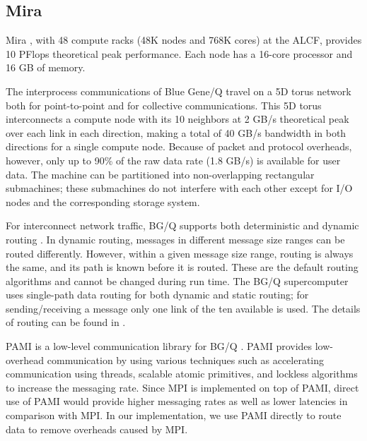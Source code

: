 \subsection{Mira}
\label{sec:system}

Mira \cite{Chen:BGQ}, with 48 compute racks (48K nodes and 768K cores) at the ALCF, provides 10 PFlops theoretical peak performance. Each node has a 16-core processor and 16 GB of memory.

The interprocess communications of Blue Gene/Q travel on a 5D torus network both for point-to-point and for collective communications. This 5D torus interconnects a compute node with its 10 neighbors at 2 GB/s theoretical peak over each link in each direction, making a total of 40 GB/s bandwidth in both directions for a single compute node. Because of packet and protocol overheads, however, only up to 90\% of the raw data rate (1.8 GB/s) is available for user data. The machine can be partitioned into non-overlapping rectangular submachines; these submachines do not interfere with each other except for I/O nodes and the corresponding storage system.

For interconnect network traffic, BG/Q supports both deterministic and dynamic routing \cite{Chen:BGQ}. In dynamic routing, messages in different message size ranges can be routed differently. However, within a given message size range, routing is always the same, and its path is known before it is routed. These are the default routing algorithms and cannot be changed during run time. The BG/Q supercomputer uses single-path data routing for both dynamic and static routing; for sending/receiving a message only one link of the ten available is used. The details of routing can be found in \cite{Chen:BGQ}.

PAMI is a low-level communication library for BG/Q \cite{PAMI:Kumar}. PAMI provides low-overhead communication by using various techniques such as accelerating communication using threads, scalable atomic primitives, and lockless algorithms to increase the messaging rate. Since MPI is implemented on top of PAMI, direct use of PAMI would provide higher messaging rates as well as lower latencies in comparison with MPI. In our implementation, we use PAMI directly to route data to remove overheads caused by MPI.
